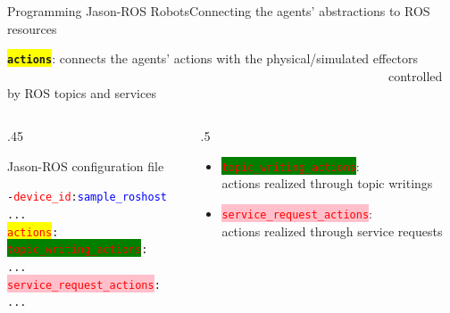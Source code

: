 \documentclass[compress]{beamer}
\newcommand{\yamlkey}[1]{\textcolor{red}{\texttt{#1}}}
\newcommand{\yamlvalue}[1]{\textcolor{blue}{\texttt{#1}}}
\begin{document}
\begin{frame}[fragile]{Programming Jason-ROS Robots}{Connecting the agents' abstractions to ROS resources}


\footnotesize
\colorbox{yellow}{\texttt{{\bf actions}}}: connects the agents' actions with the physical/simulated effectors\\

\vspace{-.5cm}
\ \ \ \ \ \ \ \ \ \ \ \ \ \ \ \ \ \ \ \ \ \ \ \ \ \ \ \ \ \ \ \ \ \ \ \ \ \ \ \ \ \ \ \ \ \ \ \ \ \ \ \ \ \ \ \ \ \ \ \ \ {\tiny controlled by ROS topics and services}
    

\begin{columns}
 \begin{column}{.45\textwidth}
 
\begin{block}{{\scriptsize Jason-ROS configuration file}}


\scriptsize
\begin{alltt}\scriptsize
- \yamlkey{device_id}: \yamlvalue{sample_roshost}
     ...
  \colorbox{yellow}{\yamlkey{actions}}:   
     \colorbox{green}{\yamlkey{topic_writing_actions}}:  
        ...
     \colorbox{pink}{\yamlkey{service_request_actions}}:
        ...
 
\end{alltt}
    
\end{block}  

 \end{column}
 
  \hspace{-20pt}
 
 \begin{column}{.5\textwidth}
 \scriptsize
 \begin{itemize}
  \item \colorbox{green}{\yamlkey{topic\_writing\_actions}}:\\ actions realized through topic writings  
  
  \vspace{.3cm}
  
  \item \colorbox{pink}{\yamlkey{service\_request\_actions}}:\\ actions realized through service requests
 \end{itemize}

  \end{column}
 
 
\end{columns}

\scriptsize

\end{frame}
\end{document}
